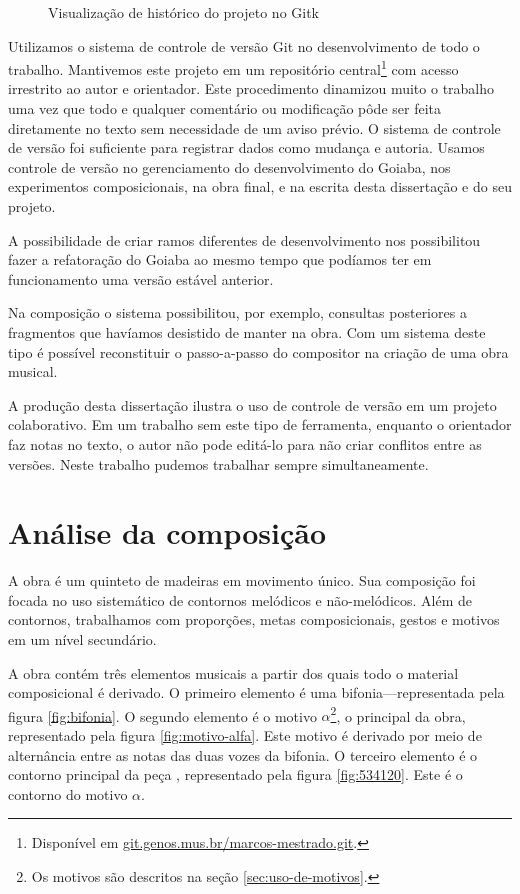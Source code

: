 \begin{figure}
  \centering
  \caption{Visualização de histórico do projeto no Gitk}
  \label{fig:historico-git}
\end{figure}

Utilizamos o sistema de controle de versão Git no desenvolvimento de
todo o trabalho. Mantivemos este projeto em um repositório
central\footnote{Disponível em
  \url{git.genos.mus.br/marcos-mestrado.git}.} com acesso irrestrito
ao autor e orientador. Este procedimento dinamizou muito o trabalho
uma vez que todo e qualquer comentário ou modificação pôde ser feita
diretamente no texto sem necessidade de um aviso prévio. O sistema de
controle de versão foi suficiente para registrar dados como mudança e
autoria. Usamos controle de versão no gerenciamento do desenvolvimento
do Goiaba, nos experimentos composicionais, na obra final, e na
escrita desta dissertação e do seu projeto.

A possibilidade de criar ramos diferentes de desenvolvimento nos
possibilitou fazer a refatoração do Goiaba ao mesmo tempo que podíamos
ter em funcionamento uma versão estável anterior.

Na composição o sistema possibilitou, por exemplo, consultas
posteriores a fragmentos que havíamos desistido de manter na obra. Com
um sistema deste tipo é possível reconstituir o passo-a-passo do
compositor na criação de uma obra musical.

A produção desta dissertação ilustra o uso de controle de versão em um
projeto colaborativo. Em um trabalho sem este tipo de ferramenta,
enquanto o orientador faz notas no texto, o autor não pode editá-lo
para não criar conflitos entre as versões. Neste trabalho pudemos
trabalhar sempre simultaneamente.


\chapter{Análise da composição}
\label{cha:anal-da-comp}

A obra \obra{} é um quinteto de madeiras em movimento único. Sua
composição foi focada no uso sistemático de contornos melódicos e
não-melódicos. Além de contornos, trabalhamos com proporções, metas
composicionais, gestos e motivos em um nível secundário.

A obra contém três elementos musicais a partir dos quais todo o
material composicional é derivado. O primeiro elemento é uma
bifonia---representada pela figura \ref{fig:bifonia}. O segundo
elemento é o motivo $\alpha$\footnote{Os motivos são descritos na
  seção \ref{sec:uso-de-motivos}.}, o principal da obra, representado
pela figura \ref{fig:motivo-alfa}. Este motivo é derivado por meio de
alternância entre as notas das duas vozes da bifonia. O terceiro
elemento é o contorno principal da peça \contpr{}, representado pela
figura \ref{fig:534120}. Este é o contorno do motivo $\alpha$.

